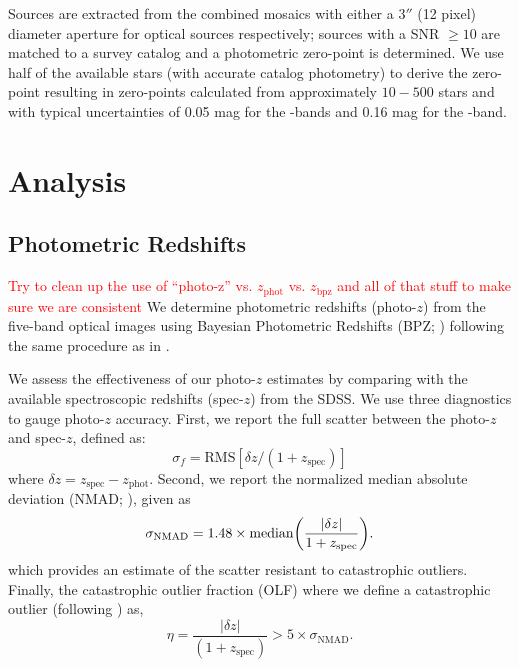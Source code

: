 \documentclass[apj, revtex4-1]{emulateapj}
\newcommand{\editorial}[1]{\textcolor{red}{#1}}
\begin{document}
Sources are extracted from the combined mosaics with either a $3''$ (12 pixel) diameter aperture for optical sources respectively; sources with a SNR $\ge10$ are matched to a survey catalog and a photometric zero-point is determined. We use half of the available stars (with accurate catalog photometry) to derive the zero-point resulting in zero-points calculated from approximately $10-500$ stars and with typical uncertainties of 0.05 mag for the \sdssg\sdssr\sdssi-bands and 0.16 mag for the \sdssz-band.

\section{Analysis}\label{sec:analysis}
\subsection{Photometric Redshifts}
\editorial{Try to clean up the use of ``photo-z'' vs. $z_\mathrm{phot}$ vs. $z_\mathrm{bpz}$ and all of that stuff to make sure we are consistent}
We determine photometric redshifts (photo-$z$) from the five-band optical images using Bayesian Photometric Redshifts (BPZ; \citealt{Benitez2000, Coe2006}) following the same procedure as in \cite{Menanteau2009a}.

We assess the effectiveness of our photo-$z$ estimates by comparing with the available spectroscopic redshifts (spec-$z$) from the SDSS. We use three diagnostics to gauge photo-$z$ accuracy. First, we report the full scatter between the photo-$z$ and spec-$z$, defined as:
\begin{equation}\label{eqn:scatter}
	\sigma_f = \mathrm{RMS}[\delta z/(1+z_\mathrm{spec})]
\end{equation}
where $\delta z = z_\mathrm{spec} - z_\mathrm{phot}$. Second, we report the normalized median absolute deviation (NMAD; \citealt{Ilbert2009, Dahlen2013, Molino2017}), given as
\begin{equation}\label{eqn:nmad}
	\sigma_\mathrm{NMAD} = 1.48 \times \mathrm{median} \bigg{(} \frac{|\delta z|}{1+z_\mathrm{spec}} \bigg{)}.
\end{equation}
which provides an estimate of the scatter resistant to catastrophic outliers. Finally, the catastrophic outlier fraction (OLF) where we define a catastrophic outlier (following \citealt{Molino2017}) as,
\begin{equation}\label{eqn:OLF}
	\eta = \frac{|\delta z|}{(1+z_\mathrm{spec})} > 5 \times \sigma_\mathrm{NMAD}.
\end{equation}
\end{document}
